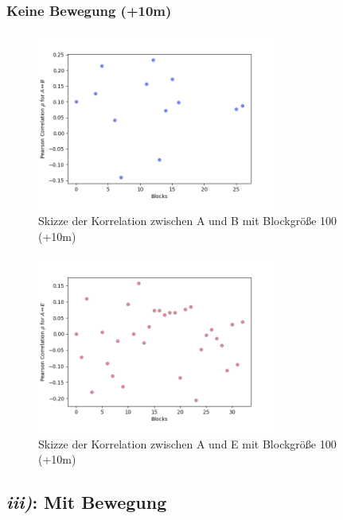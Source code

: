 \documentclass[12pt,a4paper]{article}
\begin{document}
\subsubsection*{Keine Bewegung (+10m)}

\begin{figure}[hbt!]
	\centering
		\includegraphics[width=0.7\textwidth ]
		{Bilder/a3-t3b-ob-block100-correlation-AB.png}
		\caption{Skizze der Korrelation zwischen A und B mit Blockgröße 100 (+10m)}
		\label{fig:Label10}
\end{figure}

\begin{figure}[hbt!]
	\centering
		\includegraphics[width=0.7\textwidth ]
		{Bilder/a3-t3b-ob-block100-correlation-AE.png}
		\caption{Skizze der Korrelation zwischen A und E mit Blockgröße 100 (+10m)}
		\label{fig:Label11}
\end{figure}
\clearpage






\subsection*{\textit{iii)}: Mit Bewegung}
\end{document}
